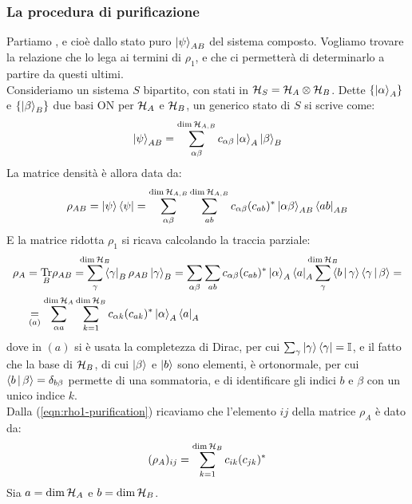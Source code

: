 \documentclass[../../InformazioneQuantistica.tex]{subfiles}
\begin{document}
\subsubsection{La procedura di purificazione}
Partiamo , e cioè dallo stato puro $\Ket{\psi}_{AB}$ del sistema composto. Vogliamo trovare la relazione che lo lega ai termini di $\rho_1$, e che ci permetterà di determinarlo a partire da questi ultimi.\\
Consideriamo un sistema $S$ bipartito, con stati in $\mathcal{H}_S = \mathcal{H}_A \otimes \mathcal{H}_B$. Dette $\{\Ket{\alpha}_A\}$ e $\{\Ket{\beta}_B\}$ due basi ON per $\mathcal{H}_A$ e $\mathcal{H}_B$, un generico stato di $S$ si scrive come:
\begin{align}
\Ket{\psi}_{AB} = \sum_{\alpha\beta}^{\operatorname{dim}\mathcal{H}_{A,B}} c_{\alpha \beta} \Ket{\alpha}_A \Ket{\beta}_B
\label{eqn:decomp-purif}
\end{align}
La matrice densità è allora data da:
\begin{align*}
\rho_{AB} = \Ket{\psi}\Bra{\psi} = \sum_{\alpha\beta}^{\operatorname{dim}\mathcal{H}_{A,B}}\sum_{ab}^{\operatorname{dim}\mathcal{H}_{A,B}} c_{\alpha \beta}(c_{ab})^* \Ket{\alpha\beta}_{AB} \Bra{ab}_{AB}
\end{align*}
E la matrice ridotta $\rho_1$ si ricava calcolando la traccia parziale:
\begin{align} \nonumber
\rho_A &= \underset{B}{\op{Tr}} \rho_{AB} = \smashoperator{\sum_\gamma^{\op{dim}\hs_B}} \bra{\gamma}_B \rho_{AB}\ket{\gamma}_B = \sum_{\alpha\beta}\sum_{ab} c_{\alpha \beta}(c_{ab})^* \ket{\alpha}_A \bra{a}_A \smashoperator{\sum_\gamma^{\op{dim}\hs_B}} \braket{b|\gamma}\braket{\gamma|\beta} =\\
&\underset{(a)}{=} \sum_{\alpha a}^{\op{dim}\hs_A} \sum_{k=1}^{\op{dim}\hs_B} c_{\alpha k} (c_{ak})^* \ket{\alpha}_A \bra{a}_A \label{eqn:rho1-purification}
\end{align}
dove in $(a)$ si è usata la completezza di Dirac, per cui $\sum_\gamma \Ket{\gamma}\Bra{\gamma}=\mathbb{I}$, e il fatto che la base di $\mathcal{H}_B$, di cui $\Ket{\beta}$ e $\Ket{b}$ sono elementi, è ortonormale, per cui $\Braket{b|\beta}=\delta_{b\beta}$ permette di  una sommatoria, e di identificare gli indici $b$ e $\beta$ con un unico indice $k$.\\
Dalla (\ref{eqn:rho1-purification}) ricaviamo che l'elemento $ij$ della matrice $\rho_A$ è dato da:
\begin{align}
(\rho_A)_{ij} =\sum_{k=1}^{\operatorname{dim}\mathcal{H}_B} c_{ik}(c_{jk})^*
\label{eqn:rhoA-terms}
\end{align}
Sia $a = \operatorname{dim}\mathcal{H}_A$ e $b=\operatorname{dim}\mathcal{H}_B$.
\end{document}
